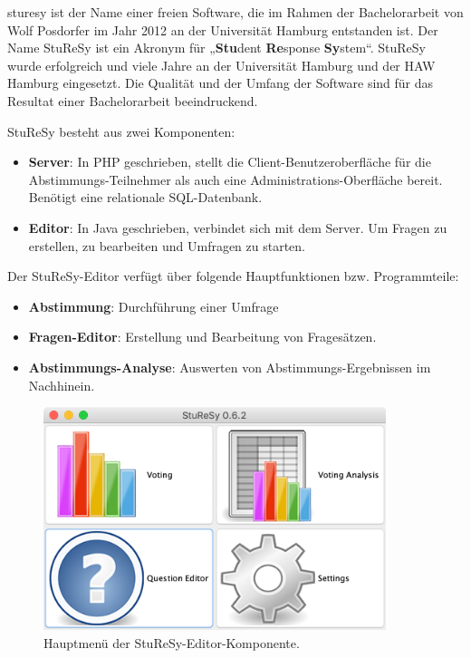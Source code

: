 \ac{sturesy} ist der Name einer freien Software, die im Rahmen der Bachelorarbeit von Wolf Posdorfer im Jahr 2012 an der Universität Hamburg entstanden ist\cite{sturesy}. Der Name StuReSy ist ein Akronym für „\textbf{Stu}dent \textbf{Re}sponse \textbf{Sy}stem“. StuReSy wurde erfolgreich und viele Jahre an der Universität Hamburg und der HAW Hamburg eingesetzt. Die Qualität und der Umfang der Software sind für das Resultat einer Bachelorarbeit beeindruckend.

StuReSy besteht aus zwei Komponenten:
\begin{itemize}
    \item \textbf{Server}: In PHP geschrieben, stellt die Client-Benutzeroberfläche für die Abstimmungs-Teilnehmer als auch eine Administrations-Oberfläche bereit. Benötigt eine relationale SQL-Datenbank.
    \item \textbf{Editor}: In Java geschrieben, verbindet sich mit dem Server. Um Fragen zu erstellen, zu bearbeiten und Umfragen zu starten.
\end{itemize}

Der StuReSy-Editor verfügt über folgende Hauptfunktionen bzw. Programmteile:
\begin{itemize}
    \item \textbf{Abstimmung}: Durchführung einer Umfrage
    \item \textbf{Fragen-Editor}: Erstellung und Bearbeitung von Fragesätzen.
    \item \textbf{Abstimmungs-Analyse}: Auswerten von Abstimmungs-Ergebnissen im Nachhinein.
\end{itemize}

\begin{figure}[H]
    \includegraphics[width=10cm]{chapter/bewertung/bilder/StuReSy_Hauptmenue.png}
    \centering
    \caption{Hauptmenü der StuReSy-Editor-Komponente.}
    \label{abb:sturesy_hauptmenue}
\end{figure}


